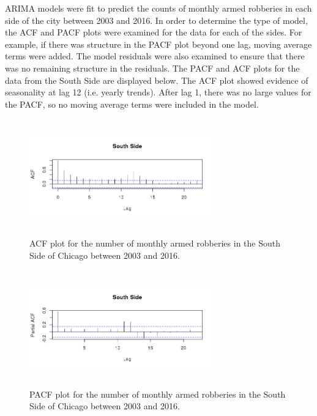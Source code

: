 \documentclass{article} %
\begin{document}
\noindent ARIMA models were fit to predict the counts of monthly armed robberies in each side of the city between 2003 and 2016. In order to determine the type of model, the ACF and PACF plots were examined for the data for each of the sides. For example, if there was structure in the PACF plot beyond one lag, moving average terms were added. The model residuals were also examined to ensure that there was no remaining structure in the residuals. The PACF and ACF plots for the data from the South Side are displayed below. The ACF plot showed evidence of seasonality at lag 12 (i.e. yearly trends). After lag 1, there was no large values for the PACF, so no moving average terms were included in the model. \newline\newline\newline
\clearpage\newpage
\begin{multicols}{2}
\begin{figure}[H]
\includegraphics[height=50mm, width=80mm]{Plots/south_ACF.png}
\caption{ACF plot for the number of monthly armed robberies in the South Side of Chicago between 2003 and 2016.}
\end{figure}

\begin{figure}[H]
\includegraphics[height=50mm, width=80mm]{Plots/south_PACF.png}
\caption{PACF plot for the number of monthly armed robberies in the South Side of Chicago between 2003 and 2016.}
\end{figure}
\end{multicols}
\end{document}
